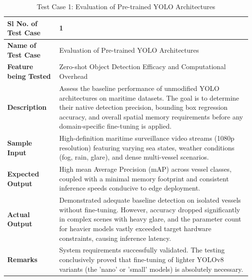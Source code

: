 \begin{table}[H]
\centering
\caption{Test Case 1: Evaluation of Pre-trained YOLO Architectures}
\label{tab:testcase1}
\begin{tabular}{|p{}|p{}|}
\hline
\textbf{Sl No. of Test Case} & 1 \\
\hline
\textbf{Name of Test Case} & Evaluation of Pre-trained YOLO Architectures \\
\hline
\textbf{Feature being Tested} & Zero-shot Object Detection Efficacy and Computational Overhead \\
\hline
\textbf{Description} & Assess the baseline performance of unmodified YOLO architectures on maritime datasets. The goal is to determine their native detection precision, bounding box regression accuracy, and overall spatial memory requirements before any domain-specific fine-tuning is applied. \\
\hline
\textbf{Sample Input} & High-definition maritime surveillance video streams (1080p resolution) featuring varying sea states, weather conditions (fog, rain, glare), and dense multi-vessel scenarios. \\
\hline
\textbf{Expected Output} & High mean Average Precision (mAP) across vessel classes, coupled with a minimal memory footprint and consistent inference speeds conducive to edge deployment. \\
\hline
\textbf{Actual Output} & Demonstrated adequate baseline detection on isolated vessels without fine-tuning. However, accuracy dropped significantly in complex scenes with heavy glare, and the parameter count for heavier models vastly exceeded target hardware constraints, causing inference latency. \\
\hline
\textbf{Remarks} & System requirements successfully validated. The testing conclusively proved that fine-tuning of lighter YOLOv8 variants (the 'nano' or 'small' models) is absolutely necessary. \\
\hline
\end{tabular}
\end{table}

